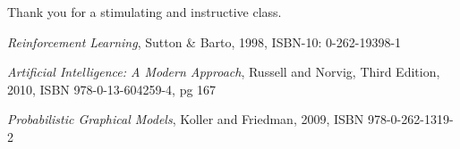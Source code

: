 \documentclass[11pt, oneside]{article}   	%
\begin{document}
Thank you for a stimulating and instructive class.

\begin{thebibliography}{1}

 \emph{Reinforcement Learning}, Sutton \& Barto, 1998, ISBN-10: 0-262-19398-1
 
 \emph{Artificial Intelligence: A Modern Approach}, Russell and Norvig, Third Edition, 2010, ISBN 978-0-13-604259-4, pg 167
 
 \emph{Probabilistic Graphical Models}, Koller and Friedman, 2009, ISBN 978-0-262-1319-2
 
  \end{thebibliography}
\end{document}
